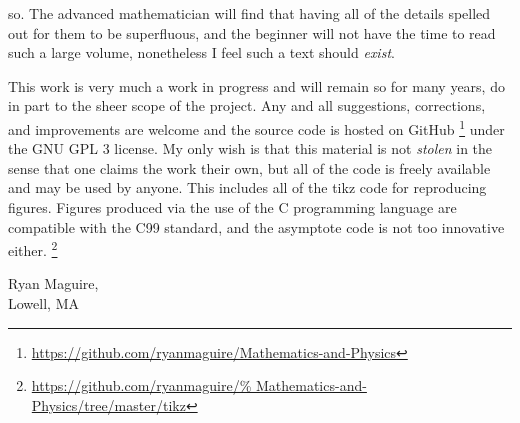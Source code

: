 so. The advanced mathematician will find that having all of the details spelled
out for them to be superfluous, and the beginner will not have the time to read
such a large volume, nonetheless I feel such a text should \textit{exist}. 
\par\hfill\par
This work is very much a work in progress and will remain so for many years, do
in part to the sheer scope of the project. Any and all suggestions, corrections,
and improvements are welcome and the source code is hosted on GitHub%
\footnote{\url{https://github.com/ryanmaguire/Mathematics-and-Physics}} under
the GNU GPL 3 license. My only wish is that this material is not
\textit{stolen} in the sense that one claims the work their own, but all of the
code is freely available and may be used by anyone. This includes all of the
tikz code for reproducing figures. Figures produced via the use of the C
programming language are compatible with the C99 standard, and the asymptote
code is not too innovative either.%
\footnote{\url{https://github.com/ryanmaguire/%
               Mathematics-and-Physics/tree/master/tikz}}
\begin{flushright}
    Ryan Maguire,\\
    Lowell, MA\\
\end{flushright}